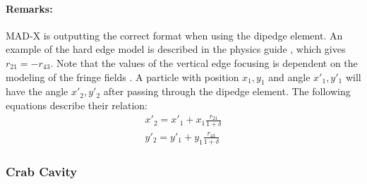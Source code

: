 \paragraph{Remarks:}
MAD-X is outputting the correct format when using the dipedge element. An example of  the hard edge model is described in the physics guide \cite{sixphys}, which gives $r_{21} = -r_{43}$.
Note that the values of the vertical edge focusing is dependent on the modeling of the fringe fields \cite{dipedge}.
A particle with position $x_{1},y_1$ and angle $x'_{1},y'_1$ will have the angle $x'_{2},y'_2$ after passing through the dipedge element.
The following equations describe their relation:
\begin{eqnarray}
    x'_{2} = x'_{1} + x_{1}\frac{r_{21}}{1+\delta} \\
    y'_{2} = y'_{1} + y_{1}\frac{r_{43}}{1+\delta}
\end{eqnarray}





\subsubsection{Crab Cavity} \label{CrabCav}

